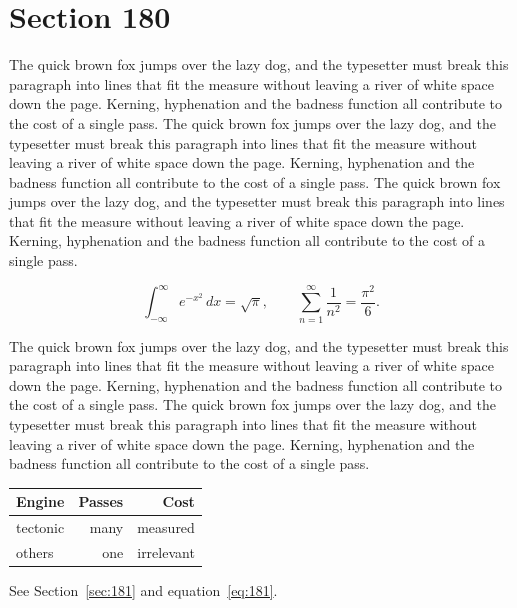 \documentclass{article}
\begin{document}
\section{Section 180}
\label{sec:180}
The quick brown fox jumps over the lazy dog, and the typesetter must break this paragraph into lines that fit the measure without leaving a river of white space down the page. Kerning, hyphenation and the badness function all contribute to the cost of a single pass. The quick brown fox jumps over the lazy dog, and the typesetter must break this paragraph into lines that fit the measure without leaving a river of white space down the page. Kerning, hyphenation and the badness function all contribute to the cost of a single pass. The quick brown fox jumps over the lazy dog, and the typesetter must break this paragraph into lines that fit the measure without leaving a river of white space down the page. Kerning, hyphenation and the badness function all contribute to the cost of a single pass. 

\begin{equation}\label{eq:180}
\int_{-\infty}^{\infty} e^{-x^{2}}\,dx = \sqrt{\pi}, \qquad
\sum_{n=1}^{\infty} \frac{1}{n^{2}} = \frac{\pi^{2}}{6}.
\end{equation}

The quick brown fox jumps over the lazy dog, and the typesetter must break this paragraph into lines that fit the measure without leaving a river of white space down the page. Kerning, hyphenation and the badness function all contribute to the cost of a single pass. The quick brown fox jumps over the lazy dog, and the typesetter must break this paragraph into lines that fit the measure without leaving a river of white space down the page. Kerning, hyphenation and the badness function all contribute to the cost of a single pass. 

\begin{center}
\begin{tabular}{lrr}
\toprule
Engine & Passes & Cost \\
\midrule
tectonic & many & measured \\
others & one & irrelevant \\
\bottomrule
\end{tabular}
\end{center}

See Section~\ref{sec:181} and equation~\eqref{eq:181}.
\end{document}
